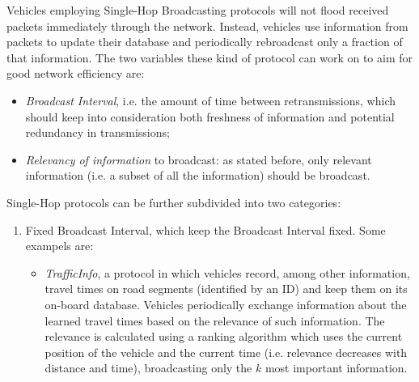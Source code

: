 \begin{enumerate}
		
		Vehicles employing Single-Hop Broadcasting protocols will not flood received packets immediately through the network. Instead, vehicles use information from packets to update their database and periodically rebroadcast only a fraction of that information. The two variables these kind of protocol can work on to aim for good network efficiency are:
		\begin{itemize}
			\item \textit{Broadcast Interval}, i.e. the amount of time between retransmissions, which should keep into consideration both freshness of information and potential redundancy in transmissions;
			\item \textit{Relevancy of information} to broadcast: as stated before, only relevant information (i.e. a subset of all the information) should be broadcast.
		\end{itemize}
		
		Single-Hop protocols can be further subdivided into two categories:
		\begin{enumerate}
			
			\item Fixed Broadcast Interval, which keep the Broadcast Interval fixed. Some exampels are:
			\begin{itemize}
				\renewcommand\labelitemi{--}
				
				\item \textit{TrafficInfo}\cite{4621303}, a protocol in which vehicles record, among other information, travel times on road segments (identified by an ID) and keep them on its on-board database. Vehicles periodically exchange information about the learned travel times based on the relevance of such information. The relevance is calculated using a ranking algorithm which uses the current position of the vehicle and the current time (i.e. relevance decreases with distance and time), broadcasting only the $k$  most important information. 
				

\end{itemize}
\end{enumerate}
\end{enumerate}
